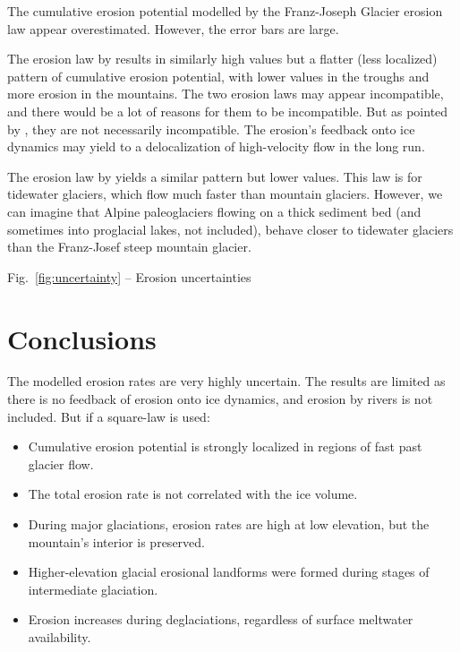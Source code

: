 \documentclass[utf8]{article}
\begin{document}
    The cumulative erosion potential modelled by the Franz-Joseph Glacier
    erosion law \citep{Herman.etal.2015} appear overestimated. However, the
    error bars are large.

    The erosion law by \citet{Cook.etal.2020} results in similarly high values
    but a flatter (less localized) pattern of cumulative erosion potential,
    with lower values in the troughs and more erosion in the mountains. The two
    erosion laws may appear incompatible, and there would be a lot of reasons
    for them to be incompatible. But as pointed by \citet{Cook.etal.2020}, they
    are not necessarily incompatible. The erosion's feedback onto ice dynamics
    may yield to a delocalization of high-velocity flow in the long run.

    The erosion law by \citet{Koppes.etal.2015} yields a similar pattern but
    lower values. This law is for tidewater glaciers, which flow much faster
    than mountain glaciers. However, we can imagine that Alpine paleoglaciers
    flowing on a thick sediment bed (and sometimes into proglacial lakes, not
    included), behave closer to tidewater glaciers than the Franz-Josef steep
    mountain glacier.

    Fig.~\ref{fig:uncertainty} -- Erosion uncertainties

\section{Conclusions}

    The modelled erosion rates are very highly uncertain. The results are
    limited as there is no feedback of erosion onto ice dynamics, and
    erosion by rivers is not included. But if a square-law is used:
    \begin{itemize}
      \item Cumulative erosion potential is strongly localized in regions
        of fast past glacier flow.
      \item The total erosion rate is not correlated with the ice volume.
      \item During major glaciations, erosion rates are high at low elevation,
        but the mountain's interior is preserved.
      \item Higher-elevation glacial erosional landforms were formed during
        stages of intermediate glaciation.
      \item Erosion increases during deglaciations, regardless of surface
        meltwater availability.
    \end{itemize}
\end{document}
